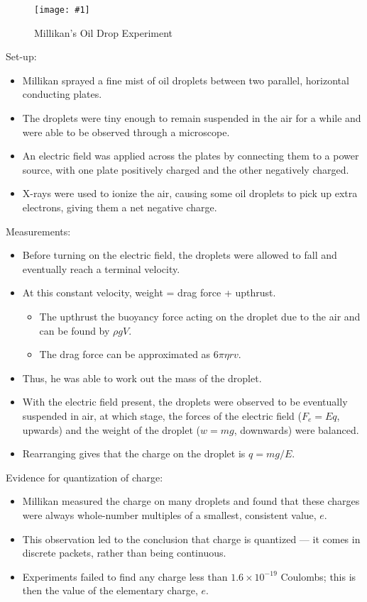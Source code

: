 \documentclass[a4paper,12pt]{article}
\newcommand{\img}[4]{\begin{center}
  \begin{figure}[H]
    \centering
    \texttt{[image: \#1]}
    \caption{#3}
    \label{fig:#4}
  \end{figure}
\end{center}}
\begin{document}
\img{oildrop.jpg}{0.7}{Millikan's Oil Drop Experiment}{oildrop}
Set-up:
\begin{itemize}
  \item Millikan sprayed a fine mist of oil droplets between two parallel, horizontal conducting plates.
  \item  The droplets were tiny enough to remain suspended in the air for a while and were able to be observed through a microscope.
  \item An electric field was applied across the plates by connecting them to a power source, with one plate positively charged and the other negatively charged.
  \item X-rays were used to ionize the air, causing some oil droplets to pick up extra electrons, giving them a net negative charge.
\end{itemize}
Measurements:
\begin{itemize}
  \item Before turning on the electric field, the droplets were allowed to fall and eventually reach a terminal velocity.
  \item At this constant velocity, weight = drag force + upthrust.
        \begin{itemize}
          \item The upthrust the buoyancy force acting on the droplet due to the air and can be found by $\rho gV$.
          \item The drag force can be approximated as $6\pi\eta rv$.
        \end{itemize}
  \item Thus, he was able to work out the mass of the droplet.
  \item With the electric field present, the droplets were observed to be eventually suspended in air, at which stage, the forces of the electric field ($F_e = Eq$, upwards) and the weight of the droplet ($w = mg$, downwards) were balanced.
  \item Rearranging gives that the charge on the droplet is $q = mg/E$.
\end{itemize}
Evidence for quantization of charge:
\begin{itemize}
  \item Millikan measured the charge on many droplets and found that these charges were always whole-number multiples of a smallest, consistent value, $e$.
  \item This observation led to the conclusion that charge is quantized --- it comes in discrete packets, rather than being continuous.
  \item Experiments failed to find any charge less than $1.6 \times 10^{-19}$ Coulombs; this is then the value of the elementary charge, $e$.
\end{itemize}
\end{document}
